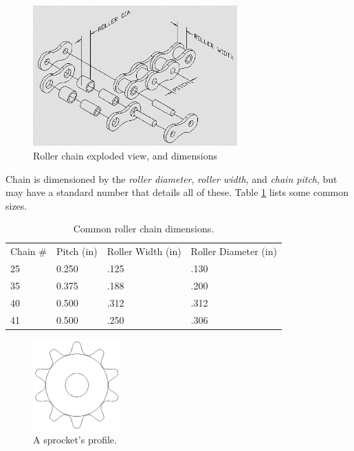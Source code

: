 \begin{figure}[H]
	\includegraphics[width=0.7\textwidth]{imgs/rollerchain_nomenclature.png}
	\caption{Roller chain exploded view, and dimensions}
\end{figure}

Chain is dimensioned by the \textit{roller diameter}, \textit{roller width}, and \textit{chain pitch}, but may have a standard number that details all of these. Table \ref{table:chaindims} lists some common sizes.

\begin{table}[H] 
\begin{tabular}{llll}
Chain \# & Pitch (in) & Roller Width (in) & Roller Diameter (in) \\
25       & 0.250      & .125              & .130                 \\
35       & 0.375      & .188              & .200                 \\
40       & 0.500      & .312              & .312                 \\
41       & 0.500      & .250              & .306                
\end{tabular}
\caption{Common roller chain dimensions.}
\label{table:chaindims}
\end{table}

\begin{figure}[H]
	\includegraphics[width=0.3\textwidth]{imgs/sprocket_profile.png}
	\caption{A sprocket's profile.}
\end{figure}

